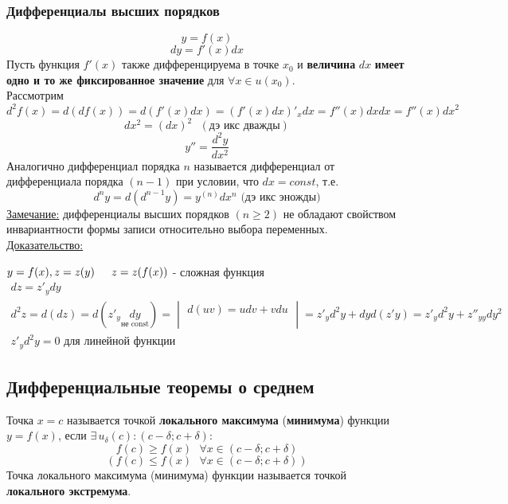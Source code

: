 \documentclass[12pt]{article}
\begin{document}
    \subsubsection*{Дифференциалы высших порядков}
    \[ y = f(x) \]
    \[ dy = f'(x)dx \]
    Пусть функция $f'(x)$ также дифференцируема в точке $x_0$ и \textbf{величина} $dx$ \textbf{имеет одно и то же фиксированное значение} для $\forall x \in u(x_0)$.\\
    Рассмотрим \[ d^2f(x) = d(df(x)) = d(f'(x)dx) = (f'(x)dx)'_x dx = f''(x)dxdx = f''(x)dx^2 \] 
    \[ dx^2 = (dx)^2 \text{ } (\text{дэ икс дважды}) \]
    \[ y'' = \frac{d^2y}{dx^2} \]
    Аналогично дифференциал порядка $n$ называется дифференциал от дифференциала порядка $(n-1)$ при условии, что $dx = const$, т.е. 
    \[ d^ny = d(d^{n-1}y) = y^{(n)}dx^n \text{ (дэ икс эножды)} \]
    \underline{Замечание:} дифференциалы высших порядков $(n \ge 2)$ не обладают свойством инвариантности формы записи относительно выбора переменных.\\
    \underline{Доказательство:}
    \begin{adjustwidth}{1.5em}{1.5em}
        $y = f(x), z = z(y) \indent z = z(f(x))$ - сложная функция\\
        \begin{gather*}
            dz = z'_ydy\\
            d^2z = d(dz) = d(z'_y\underset{\text{не const}}{dy}) = \begin{vmatrix}
                d(uv) = udv + vdu\\
                \\
            \end{vmatrix} = z'_yd^2y + dyd(z'y) = z'_yd^2y + z''_{yy}dy^2\\
            z'_yd^2y = 0 \text{ для линейной функции}
        \end{gather*}
    \end{adjustwidth}

    \subsection{Дифференциальные теоремы о среднем}\noindent
    Точка $x = c$ называется точкой \textbf{локального максимума} (\textbf{минимума}) функции $y = f(x)$, если $\exists\,u_\delta(c) : (c - \delta; c + \delta) : $\\
    \[ f(c) \ge f(x) \text{ } \forall x \in (c - \delta; c + \delta) \]
    \[ \left( f(c) \le f(x) \text{ } \forall x \in (c - \delta; c + \delta) \right) \]
    Точка локального максимума (минимума) функции называется точкой \textbf{локального экстремума}.
\end{document}
